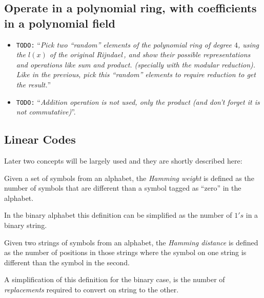 \documentclass[10pt,a4paper,twoside]{llncs}
\newcommand{\todo}[1]{\texttt{\color{red}TODO:} ``\emph{#1}''}
\newcommand{\rijndael}{\emph{Rijndael}}
\begin{document}
\subsection{Operate in a polynomial ring, with coefficients in a polynomial field}\label{sec:polynomialRing}
\begin{itemize}
\item \todo{Pick two ``random'' elements of the polynomial ring of degree $4$, using the $l(x)$ of the original \rijndael\,, and show their possible representations and operations like sum and product. (specially with the modular reduction). Like in the previous, pick this ``random'' elements to require reduction to get the result.}
 \item \todo{Addition operation is not used, only the product (and don't forget it is not commutative)}.
\end{itemize}

\subsection{Linear Codes}\label{sec:LinearCodes}

Later two concepts will be largely used and they are shortly described here:

\begin{definition}\label{def:hammingWeight}
    Given a set of symbols from an alphabet, the \emph{Hamming weight} is defined as the number of symbols that are different than a symbol tagged as ``zero'' in the alphabet.
\end{definition}

In the binary alphabet this definition can be simplified as the number of $1's$ in a binary string.

\begin{definition}\label{def:hammingDistance}
    Given two strings of symbols from an alphabet, the \emph{Hamming distance} is defined as the number of positions in those strings where the symbol on one string is different than the symbol in the second.
\end{definition}

A simplification of this definition for the binary case, is the number of \emph{replacements} required to convert on string to the other.

\end{document}
